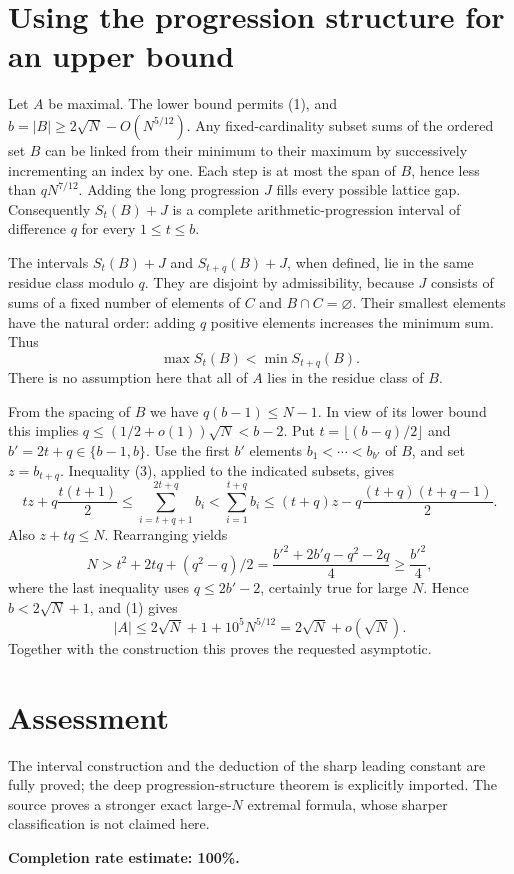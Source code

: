 \documentclass[11pt]{article}
\begin{document}
\section*{Using the progression structure for an upper bound}
Let $A$ be maximal. The lower bound permits (1), and $b=|B|\ge2\sqrt N-O(N^{5/12})$. Any fixed-cardinality subset sums of the ordered set $B$ can be linked from their minimum to their maximum by successively incrementing an index by one. Each step is at most the span of $B$, hence less than $qN^{7/12}$. Adding the long progression $J$ fills every possible lattice gap. Consequently $S_t(B)+J$ is a complete arithmetic-progression interval of difference $q$ for every $1\le t\le b$.

The intervals $S_t(B)+J$ and $S_{t+q}(B)+J$, when defined, lie in the same residue class modulo $q$. They are disjoint by admissibility, because $J$ consists of sums of a fixed number of elements of $C$ and $B\cap C=\varnothing$. Their smallest elements have the natural order: adding $q$ positive elements increases the minimum sum. Thus
\[
 \max S_t(B)<\min S_{t+q}(B).\tag{3}
\]
There is no assumption here that all of $A$ lies in the residue class of $B$.

From the spacing of $B$ we have $q(b-1)\le N-1$. In view of its lower bound this implies $q\le(1/2+o(1))\sqrt N<b-2$. Put $t=\lfloor(b-q)/2\rfloor$ and $b'=2t+q\in\{b-1,b\}$. Use the first $b'$ elements $b_1<\cdots<b_{b'}$ of $B$, and set $z=b_{t+q}$. Inequality (3), applied to the indicated subsets, gives
\[
 tz+q\frac{t(t+1)}2
 \le\sum_{i=t+q+1}^{2t+q}b_i
 <\sum_{i=1}^{t+q}b_i
 \le(t+q)z-q\frac{(t+q)(t+q-1)}2.
\]
Also $z+tq\le N$. Rearranging yields
\[
 N>t^2+2tq+(q^2-q)/2
   =\frac{b'^2+2b'q-q^2-2q}{4}\ge\frac{b'^2}{4},
\]
where the last inequality uses $q\le2b'-2$, certainly true for large $N$. Hence $b<2\sqrt N+1$, and (1) gives
\[
 |A|\le2\sqrt N+1+10^5N^{5/12}=2\sqrt N+o(\sqrt N).
\]
Together with the construction this proves the requested asymptotic.

\section*{Assessment}
The interval construction and the deduction of the sharp leading constant are fully proved; the deep progression-structure theorem is explicitly imported. The source proves a stronger exact large-$N$ extremal formula, whose sharper classification is not claimed here.

\textbf{Completion rate estimate: 100\%.}
\end{document}
